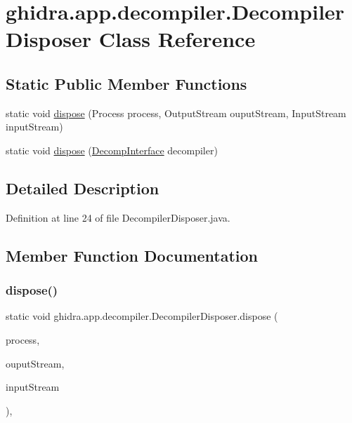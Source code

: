 \hypertarget{classghidra_1_1app_1_1decompiler_1_1_decompiler_disposer}{}\section{ghidra.\+app.\+decompiler.\+Decompiler\+Disposer Class Reference}
\label{classghidra_1_1app_1_1decompiler_1_1_decompiler_disposer}
\subsection*{Static Public Member Functions}
\begin{DoxyCompactItemize}
\item 
static void \mbox{\hyperlink{classghidra_1_1app_1_1decompiler_1_1_decompiler_disposer_ab905d5a11a054fb5df7b96b15e45ccc5}{dispose}} (Process process, Output\+Stream ouput\+Stream, Input\+Stream input\+Stream)
\item 
static void \mbox{\hyperlink{classghidra_1_1app_1_1decompiler_1_1_decompiler_disposer_a4bd490c8e90e1e320da1d0e16bc4025a}{dispose}} (\mbox{\hyperlink{classghidra_1_1app_1_1decompiler_1_1_decomp_interface}{Decomp\+Interface}} decompiler)
\end{DoxyCompactItemize}


\subsection{Detailed Description}


Definition at line 24 of file Decompiler\+Disposer.\+java.



\subsection{Member Function Documentation}
\mbox{\label{classghidra_1_1app_1_1decompiler_1_1_decompiler_disposer_ab905d5a11a054fb5df7b96b15e45ccc5}} 
\subsubsection{\texorpdfstring{dispose()}{dispose()}\hspace{0.1cm}{\footnotesize\ttfamily [1/2]}}
{\footnotesize\ttfamily static void ghidra.\+app.\+decompiler.\+Decompiler\+Disposer.\+dispose (\begin{DoxyParamCaption}\item[{Process}]{process,  }\item[{Output\+Stream}]{ouput\+Stream,  }\item[{Input\+Stream}]{input\+Stream }\end{DoxyParamCaption})\hspace{0.3cm}{\ttfamily [inline]}, {\ttfamily [static]}}

